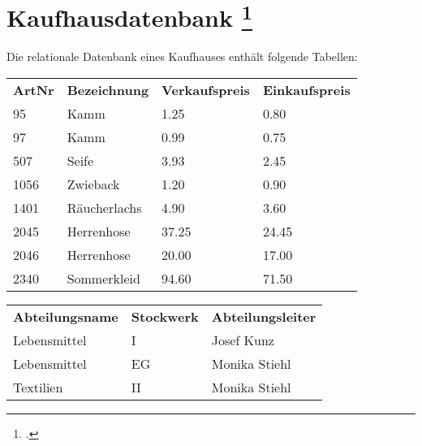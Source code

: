 \documentclass{bschlangaul-aufgabe}
\begin{document}

\section{Kaufhausdatenbank
\footcite[Aufgabe 1: Kaufhausdatenbank - einfacher Einstieg]{db:ab:2}
}

Die relationale Datenbank eines Kaufhauses enthält folgende Tabellen:


\begin{tabular}{llll}
\textbf{ArtNr} & \textbf{Bezeichnung}  & \textbf{Verkaufspreis} & \textbf{Einkaufspreis} \\
95    & Kamm         & 1.25          & 0.80          \\
97    & Kamm         & 0.99          & 0.75          \\
507   & Seife        & 3.93          & 2.45          \\
1056  & Zwieback     & 1.20          & 0.90          \\
1401  & Räucherlachs & 4.90          & 3.60          \\
2045  & Herrenhose   & 37.25         & 24.45         \\
2046  & Herrenhose   & 20.00         & 17.00         \\
2340  & Sommerkleid  & 94.60         & 71.50
\end{tabular}


\begin{tabular}{lll}
\textbf{Abteilungsname} & \textbf{Stockwerk} & \textbf{Abteilungsleiter} \\
Lebensmittel   & I         & Josef Kunz       \\
Lebensmittel   & EG        & Monika Stiehl    \\
Textilien      & II        & Monika Stiehl
\end{tabular}

\end{document}
